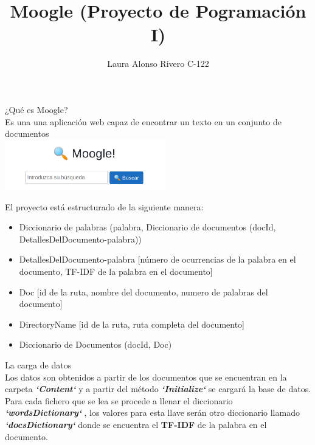 \documentclass{beamer}
\title{\textbf{Moogle} (Proyecto de Pogramación I)}
\author{Laura Alonso Rivero C-122}
\date{}
\begin{document}
\maketitle
\begin{frame}
\begin{center}
\Large{¿Qué es Moogle?}\linebreak \\
\large{Es una  una aplicación web capaz de encontrar un texto en un
conjunto de documentos}\linebreak \\
\includegraphics[width=7cm]{moogle.png}
\end{center}
\end{frame}

\begin{frame}
 \begin{flushleft}
\Large{El proyecto está estructurado de la siguiente manera:}
\begin{itemize}
\item\normalsize{Diccionario de palabras (palabra, Diccionario de documentos (docId, DetallesDelDocumento-palabra))}
\item\normalsize{DetallesDelDocumento-palabra [número de ocurrencias de la palabra en el documento, TF-IDF de la palabra en el documento]}
\item\normalsize{Doc [id de la ruta, nombre del documento, numero de palabras del documento]}
\item\normalsize{DirectoryName [id de la ruta, ruta completa del documento]}
\item\normalsize{Diccionario de Documentos (docId, Doc)}
\end{itemize}
\end{flushleft}
\end{frame}

\begin{frame}
 \begin{flushleft}
\Large{La carga de datos}\linebreak \\
\normalsize{Los datos son obtenidos a partir de los documentos que se encuentran en la carpeta \textbf{\textit{`Content`}} y a partir del método \textbf{\textit{`Initialize`}} se cargará la base de datos. \linebreak \\
Para cada fichero que se lea se procede a llenar el diccionario \textbf{\textit{`wordsDictionary`}} , los valores para esta llave serán otro diccionario llamado \textbf{\textit{`docsDictionary`}} donde se encuentra el \textbf{TF-IDF} de la palabra en el documento.}
\end{flushleft}
\end{frame}
\end{document}
